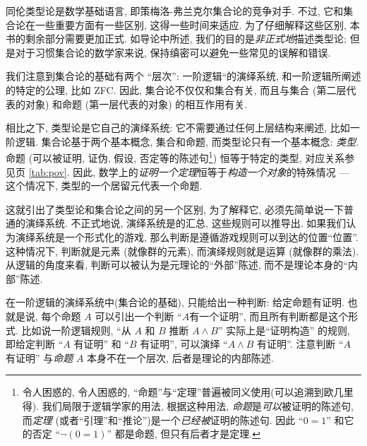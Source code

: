 \label{sec:axioms}

同伦类型论是数学基础语言, 即策梅洛-弗兰克尔集合论的竞争对手. 不过, 它和集合论在一些重要方面有一些区别, 这得一些时间来适应. 为了仔细解释这些区别, 本书的剩余部分需要更加正式. 如导论中所述, 我们的目的是\emph{非正式地}描述类型论; 但是对于习惯集合论的数学家来说, 保持缜密可以避免一些常见的误解和错误.

我们注意到集合论的基础有两个 ``层次'': 一阶逻辑``的演绎系统, 和一阶逻辑所阐述的特定的公理, 比如 ZFC. 因此, 集合论不仅仅和集合有关, 而且与集合 (第二层代表的对象) 和命题 (第一层代表的对象) 的相互作用有关.

相比之下, 类型论是它自己的演绎系统: 它不需要通过任何上层结构来阐述, 比如一阶逻辑. 集合论基于两个基本概念, 集合和命题, 而类型论只有一个基本概念: \emph{类型}. 命题 (可以被证明, 证伪, 假设, 否定等的陈述句\footnote{令人困惑的, 令人困惑的, ``命题''与``定理''普遍被同义使用(可以追溯到欧几里得). 我们局限于逻辑学家的用法, 根据这种用法, \emph{命题}是\emph{可以}被证明的陈述句, 而\emph{定理} (或者``引理''和``推论'')是一个\emph{已经被}证明的陈述句. 因此 ``$0=1$'' 和它的否定 ``$\neg(0=1)$'' 都是命题, 但只有后者才是定理.}) 恒等于特定的类型, 对应关系参见\pageref{tab:pov}页 \cref{tab:pov}. 因此, 数学上的\emph{证明一个定理}恒等于\emph{构造一个对象}的特殊情况 --- 这个情况下, 类型的一个居留元代表一个命题.

%
这就引出了类型论和集合论之间的另一个区别, 为了解释它, 必须先简单说一下普通的演绎系统. 不正式地说, 演绎系统是的汇总,%
这些规则可以推导出. %
如果我们认为演绎系统是一个形式化的游戏, %
那么判断是遵循游戏规则可以到达的位置``位置''. 这种情况下, 判断就是元素 (就像群的元素), 而演绎规则就是运算 (就像群的乘法). 从逻辑的角度来看, 判断可以被认为是元理论的``外部''陈述, 而不是理论本身的``内部''陈述.

在一阶逻辑的演绎系统中(集合论的基础), 只能给出一种判断: 给定命题有证明. 也就是说, 每个命题 $A$ 可以引出一个判断 ``$A$有一个证明'', 而且所有判断都是这个形式. 比如说一阶逻辑规则, ``从 $A$ 和 $B$ 推断 $A\wedge B$'' 实际上是``证明构造'' 的规则, 即给定判断 ``$A$ 有证明'' 和 ``$B$ 有证明'', 可以演绎 ``$A\wedge B$ 有证明''. 注意判断 ``$A$ 有证明'' 与\emph{命题} $A$ 本身不在一个层次, 后者是理论的内部陈述. %


